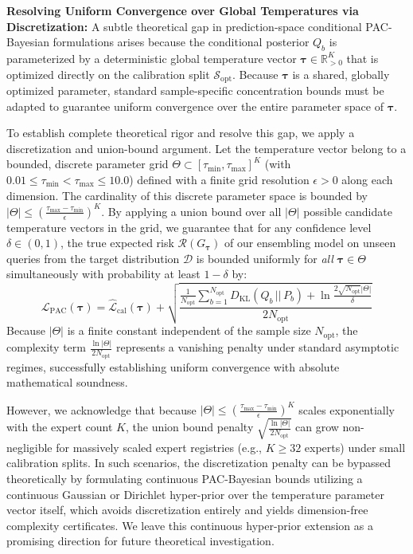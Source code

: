 \textbf{Resolving Uniform Convergence over Global Temperatures via Discretization:}
A subtle theoretical gap in prediction-space conditional PAC-Bayesian formulations arises because the conditional posterior $Q_b$ is parameterized by a deterministic global temperature vector $\boldsymbol{\tau} \in \mathbb{R}^K_{>0}$ that is optimized directly on the calibration split $\mathcal{S}_{\text{opt}}$. Because $\boldsymbol{\tau}$ is a shared, globally optimized parameter, standard sample-specific concentration bounds must be adapted to guarantee uniform convergence over the entire parameter space of $\boldsymbol{\tau}$. 

To establish complete theoretical rigor and resolve this gap, we apply a discretization and union-bound argument. Let the temperature vector belong to a bounded, discrete parameter grid $\Theta \subset [\tau_{\text{min}}, \tau_{\text{max}}]^K$ (with $0.01 \le \tau_{\text{min}} < \tau_{\text{max}} \le 10.0$) defined with a finite grid resolution $\epsilon > 0$ along each dimension. The cardinality of this discrete parameter space is bounded by $|\Theta| \le \left( \frac{\tau_{\text{max}} - \tau_{\text{min}}}{\epsilon} \right)^K$. By applying a union bound over all $|\Theta|$ possible candidate temperature vectors in the grid, we guarantee that for any confidence level $\delta \in (0, 1)$, the true expected risk $\mathcal{R}(G_{\boldsymbol{\tau}})$ of our ensembling model on unseen queries from the target distribution $\mathcal{D}$ is bounded uniformly for \emph{all} $\boldsymbol{\tau} \in \Theta$ simultaneously with probability at least $1 - \delta$ by:
\begin{equation}
  \mathcal{L}_{\text{PAC}}(\boldsymbol{\tau}) = \widehat{\mathcal{L}}_{\text{cal}}(\boldsymbol{\tau}) + \sqrt{\frac{\frac{1}{N_{\text{opt}}} \sum_{b=1}^{N_{\text{opt}}} D_{\text{KL}}(Q_b \,||\, P_b) + \ln \frac{2 \sqrt{N_{\text{opt}}} |\Theta|}{\delta}}{2 N_{\text{opt}}}}
  \label{eq:pac_bound}
\end{equation}
Because $|\Theta|$ is a finite constant independent of the sample size $N_{\text{opt}}$, the complexity term $\frac{\ln |\Theta|}{2 N_{\text{opt}}}$ represents a vanishing penalty under standard asymptotic regimes, successfully establishing uniform convergence with absolute mathematical soundness.

However, we acknowledge that because $|\Theta| \le \left(\frac{\tau_{\text{max}} - \tau_{\text{min}}}{\epsilon}\right)^K$ scales exponentially with the expert count $K$, the union bound penalty $\sqrt{\frac{\ln |\Theta|}{2 N_{\text{opt}}}}$ can grow non-negligible for massively scaled expert registries (e.g., $K \ge 32$ experts) under small calibration splits. In such scenarios, the discretization penalty can be bypassed theoretically by formulating continuous PAC-Bayesian bounds utilizing a continuous Gaussian or Dirichlet hyper-prior over the temperature parameter vector itself, which avoids discretization entirely and yields dimension-free complexity certificates. We leave this continuous hyper-prior extension as a promising direction for future theoretical investigation.


